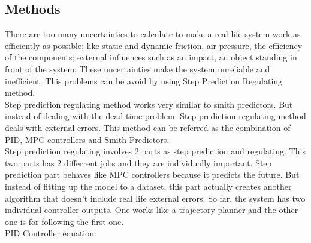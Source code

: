 \documentclass[9pt]{article}
\begin{document}
\begin{multicols}{2}
\section{Methods}
There are too many uncertainties to calculate to make a real-life system work as efficiently as possible; like static and dynamic friction, air pressure, the efficiency of the components; external influences such  as an impact, an object standing in front of the system. These uncertainties make the system unreliable and 
inefficient. This problems can be avoid by using Step Prediction Regulating method.\\[0.4mm]
Step prediction regulating method works very similar to smith predictors. But instead of dealing with the dead-time
problem. Step prediction regulating method deals with external errors. This method can be referred as the combination of PID, MPC controllers and Smith Predictors.\\[0.4mm]
Step prediction regulating involves 2 parts as step prediction and regulating. This two parts has 2 differrent jobs and they are individually important. Step prediction part behaves like MPC controllers because it predicts the future. But instead of fitting up the model to a dataset, this part actually creates another algorithm that doesn't include real life external errors. So far, the system has two individual controller outputs. One works like a trajectory planner and the other one is for following the first one.\\[0.4mm]
PID Controller equation:


\end{multicols}
\end{document}
